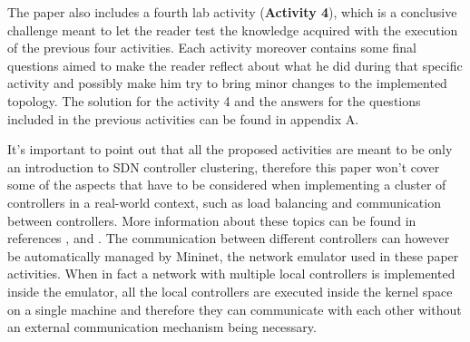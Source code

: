 \documentclass[12pt, a4paper]{article}
\begin{document}
The paper also includes a fourth lab activity (\textbf{Activity 4}), which is a conclusive challenge meant
to let the reader test the knowledge acquired with the execution of the previous
four activities. Each activity moreover contains some final questions aimed to make the reader
reflect about what he did during that specific activity and possibly make him try to
bring minor changes to the implemented topology. The solution for the activity 4
and the answers for the questions included in the previous activities can be
found in appendix A.

It's important to point out that all the proposed activities are meant to be
only an introduction to SDN controller clustering, therefore this paper won't cover
some of the aspects that have to be considered when implementing a cluster of
controllers in a real-world context, such as load balancing and communication
between controllers. More information about these topics can be found in references
\cite{ref-2}, \cite{ref-1} and \cite{ref-9}.
The communication between different controllers can however be automatically managed
by Mininet, the network emulator used in these paper activities. When in fact a
network with multiple local controllers is implemented inside the emulator, all
the local controllers are executed inside the kernel space on a single machine
and therefore they can communicate with each other without an external
communication mechanism being necessary.






\end{document}
